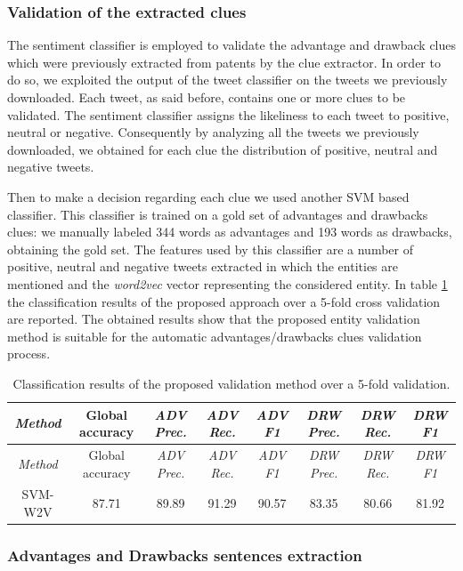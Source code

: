\documentclass[]{book}
\theoremstyle{definition}
\theoremstyle{definition}
\theoremstyle{definition}
\theoremstyle{remark}
\begin{document}
\subsubsection*{Validation of the extracted
clues}\label{validation-of-the-extracted-clues}

The sentiment classifier is employed to validate the advantage and
drawback clues which were previously extracted from patents by the clue
extractor. In order to do so, we exploited the output of the tweet
classifier on the tweets we previously downloaded. Each tweet, as said
before, contains one or more clues to be validated. The sentiment
classifier assigns the likeliness to each tweet to positive, neutral or
negative. Consequently by analyzing all the tweets we previously
downloaded, we obtained for each clue the distribution of positive,
neutral and negative tweets.

Then to make a decision regarding each clue we used another SVM based
classifier. This classifier is trained on a gold set of advantages and
drawbacks clues: we manually labeled 344 words as advantages and 193
words as drawbacks, obtaining the gold set. The features used by this
classifier are a number of positive, neutral and negative tweets
extracted in which the entities are mentioned and the \emph{word2vec}
vector representing the considered entity. In table
\ref{tab:sentiment-validation} the classification results of the
proposed approach over a 5-fold cross validation are reported. The
obtained results show that the proposed entity validation method is
suitable for the automatic advantages/drawbacks clues validation
process.

\begin{longtable}[]{@{}cccccccc@{}}
\caption{\label{tab:sentiment-validation} Classification results of the
proposed validation method over a 5-fold validation.}\tabularnewline
\toprule
\emph{Method} & Global accuracy & \emph{ADV Prec.} & \emph{ADV Rec.} &
\emph{ADV F1} & \emph{DRW Prec.} & \emph{DRW Rec.} & \emph{DRW
F1}\tabularnewline
\midrule
\endfirsthead
\toprule
\emph{Method} & Global accuracy & \emph{ADV Prec.} & \emph{ADV Rec.} &
\emph{ADV F1} & \emph{DRW Prec.} & \emph{DRW Rec.} & \emph{DRW
F1}\tabularnewline
\midrule
\endhead
SVM-W2V & 87.71 & 89.89 & 91.29 & 90.57 & 83.35 & 80.66 &
81.92\tabularnewline
\bottomrule
\end{longtable}

\subsubsection*{Advantages and Drawbacks sentences
extraction}\label{advantages-and-drawbacks-sentences-extraction}
\end{document}
